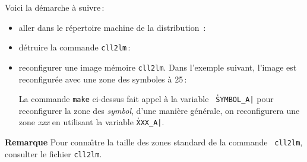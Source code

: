 Voici la d\'{e}marche \`{a} suivre\,:

\begin{itemize}
\item aller dans le r\'{e}pertoire machine de la distribution \LeLisp\,:
\begin{Code*}
\end{Code*}
\item d\'{e}truire la commande {\tt cll2lm}\,:
\begin{Code*}
\end{Code*}
\item reconfigurer une image m\'{e}moire {\tt cll2lm}. Dans
l'exemple suivant, l'image est reconfigur\'{e}e avec une zone des
symboles \`{a} 25\,:
\begin{Code*}
\end{Code*}
La commande {\tt make} ci-dessus fait appel \`{a} la variable {\tt
\|SYMBOL_A|} pour reconfigurer la zone des {\em symbol}, d'une
mani\`{e}re  g\'{e}n\'{e}rale, on reconfigurera une zone {\em xxx} en utilisant
la variable {\tt \|XXX_A|}.
\end{itemize}

\begin{Side}{\bf Remarque} 
Pour conna\^{\i}tre la taille des zones standard de la commande {\tt
cll2lm}, consulter le fichier {\tt cll2lm}.
\begin{Code*}
\end{Code*}
\end{Side}
